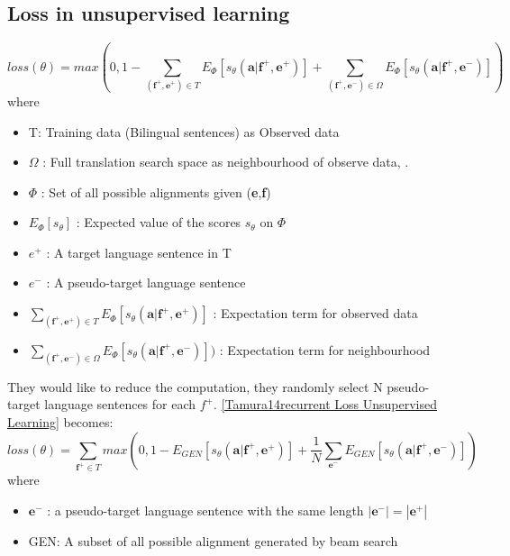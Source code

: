 \documentclass{article}
\begin{document}
\subsection{Loss in unsupervised learning} 
\begin{equation}
loss(\theta) = max(0 , 1 - \sum_{(\textbf{f}^+,\textbf{e}^+) \in T} E_{\Phi} [s_{\theta} (\textbf{a}|\textbf{f}^+, \textbf{e}^+)]  + \sum_{(\textbf{f}^+,\textbf{e}^-) \in \Omega} E_{\Phi} [s_{\theta} (\textbf{a}|\textbf{f}^+, \textbf{e}^-)] )
\label{Tamura14recurrent Loss Unsupervised Learning}
\end{equation}
where
\begin{itemize}
\item T: Training data (Bilingual sentences) as Observed data
\item $\Omega$ : Full translation search space as neighbourhood of observe data, .
\item $\Phi$ : Set of all possible alignments given (\textbf{e},\textbf{f})
\item $E_{\Phi} [s_{\theta}]$ : Expected value of the scores $s_\theta$ on $\Phi$
\item $e^+$ : A target language sentence in T
\item $e^-$ : A pseudo-target language sentence
\item $\sum_{(\textbf{f}^+,\textbf{e}^+) \in T} E_{\Phi} [s_{\theta} (\textbf{a}|\textbf{f}^+, \textbf{e}^+)]$ : Expectation term for observed data
\item$ \sum_{(\textbf{f}^+,\textbf{e}^-) \in \Omega} E_{\Phi} [s_{\theta} (\textbf{a}|\textbf{f}^+, \textbf{e}^-)] )$ : Expectation term for neighbourhood
\end{itemize}

They would like to reduce the computation, they randomly select N pseudo-target language sentences for each $f^+$. \eqref{Tamura14recurrent Loss Unsupervised Learning} becomes:
\begin{equation}
loss(\theta) = \sum_{\textbf{f}^+ \in T} max(0 , 1 -  E_{GEN} [s_{\theta} (\textbf{a}|\textbf{f}^+, \textbf{e}^+)]  + \frac{1}{N} \sum_{\textbf{e}^-} E_{GEN} [s_{\theta} (\textbf{a}|\textbf{f}^+, \textbf{e}^-)] )
\end{equation}
where
\begin{itemize}
\item $\textbf{e}^-$ : a pseudo-target language sentence with the same length $|\textbf{e}^-| = |\textbf{e}^+|$
\item GEN: A subset of all possible alignment generated by beam search
\end{itemize}
\end{document}
